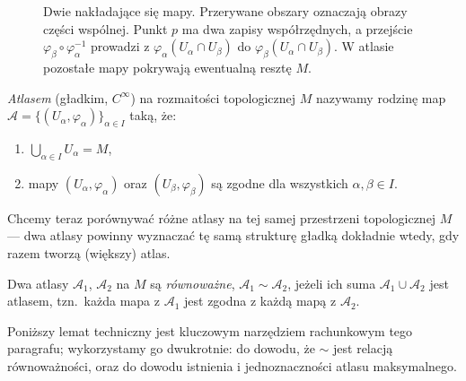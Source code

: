 \begin{figure}[H]
\caption{Dwie nakładające się mapy. Przerywane obszary
oznaczają obrazy części wspólnej. Punkt $p$ ma
dwa zapisy współrzędnych, a przejście
$\varphi_\beta\circ\varphi_\alpha^{-1}$ prowadzi
z $\varphi_\alpha(U_\alpha\cap U_\beta)$ do
$\varphi_\beta(U_\alpha\cap U_\beta)$. W atlasie
pozostałe mapy pokrywają ewentualną resztę $M$.}
\label{fig:atlas-przejscie-dwie-mapy}
\end{figure}

\begin{definicja}
\emph{Atlasem} (gładkim, $C^\infty$) na rozmaitości topologicznej $M$ nazywamy rodzinę map
$\mathcal{A}=\{(U_\alpha,\varphi_\alpha)\}_{\alpha\in I}$ taką, że:
\begin{enumerate}[label=(\roman*)]
\item $\bigcup_{\alpha\in I}U_\alpha=M$,
\item mapy $(U_\alpha,\varphi_\alpha)$ oraz $(U_\beta,\varphi_\beta)$ są zgodne dla
wszystkich $\alpha,\beta\in I$.
\end{enumerate}
\end{definicja}



Chcemy teraz porównywać różne atlasy na tej samej przestrzeni topologicznej $M$ — dwa
atlasy powinny wyznaczać tę samą strukturę gładką dokładnie wtedy, gdy razem tworzą
(większy) atlas.

\begin{definicja}
Dwa atlasy $\mathcal{A}_1$, $\mathcal{A}_2$ na $M$ są \emph{równoważne}, $\mathcal A_1\sim
\mathcal A_2$, jeżeli ich suma $\mathcal{A}_1\cup\mathcal{A}_2$ jest atlasem, tzn.\ każda
mapa z $\mathcal{A}_1$ jest zgodna z każdą mapą z $\mathcal{A}_2$.
\end{definicja}

Poniższy lemat techniczny jest kluczowym narzędziem rachunkowym tego paragrafu; wykorzystamy
go dwukrotnie: do dowodu, że $\sim$ jest relacją równoważności, oraz do dowodu istnienia i
jednoznaczności atlasu maksymalnego.

